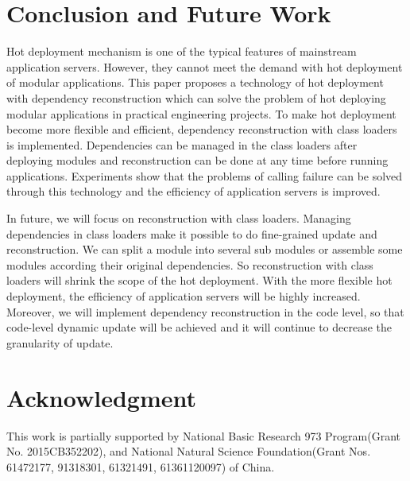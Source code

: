 \documentclass[conference]{IEEEtran}
\begin{document}
\section{Conclusion and Future Work\label{sec:conclusion}}
Hot deployment mechanism is one of the typical features of mainstream application servers.
However, they cannot meet the demand with hot deployment of modular applications.
This paper proposes a technology of hot deployment with dependency reconstruction which can solve the problem of hot deploying modular applications in practical engineering projects.
To make hot deployment become more flexible and efficient, dependency reconstruction with class loaders is implemented.
Dependencies can be managed in the class loaders after deploying modules and reconstruction can be done at any time before running applications. 
Experiments show that the problems of calling failure can be solved through this technology and the efficiency of application servers is improved.

In future, we will focus on reconstruction with class loaders.
Managing dependencies in class loaders make it possible to do fine-grained update and reconstruction.
We can split a module into several sub modules or assemble some modules according their original dependencies.
So reconstruction with class loaders will shrink the scope of the hot deployment.
With the more flexible hot deployment, the efficiency of application servers will be highly increased.
Moreover, we will implement dependency reconstruction in the code level\cite{future_Gu}, so that code-level dynamic update will be achieved and it will continue to decrease the granularity of update.

\section*{Acknowledgment}
This work is partially supported by National Basic Research 973 Program(Grant No. 2015CB352202), and National Natural Science Foundation(Grant Nos. 61472177, 91318301, 61321491, 61361120097) of China.

\end{document}
